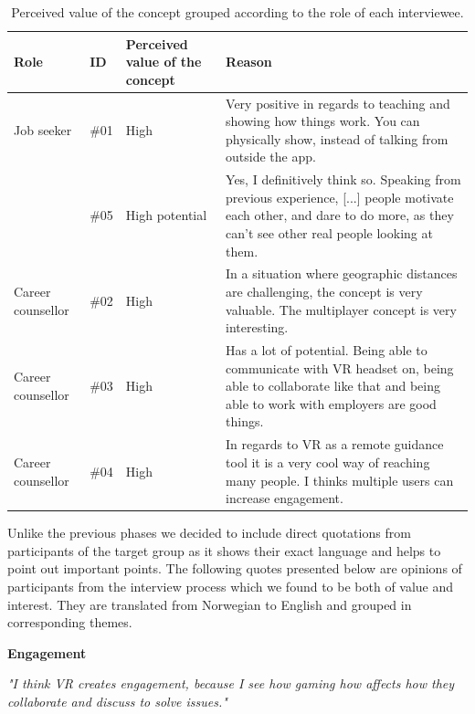 \begin{table}[H]
      \centering
        \begin{tabular}{llp{2.5cm}p{5cm}}
        \toprule
        Role & ID & Perceived value of the concept & Reason\\
        \midrule\vspace{0.2cm}
         Job seeker  & \#01 & High & Very positive in regards to teaching and showing how things work. You can physically show, instead of talking from outside the app.\\
         & \#05  & High potential & Yes, I definitively think so. Speaking from previous experience, [...] people motivate each other, and dare to do more, as they can't see other real people looking at them.
         \\\midrule \vspace{0.2cm}
        Career counsellor & \#02  & High & In a situation where geographic distances are challenging, the concept is very valuable. The multiplayer concept is very interesting.\\ \vspace{0.2cm}
        Career counsellor & \#03  & High & Has a lot of potential. Being able to communicate with VR headset on, being able to collaborate like that and being able to work with employers are good things. \\ 
        Career counsellor & \#04  & High & In regards to VR as a remote guidance tool it is a very cool way of reaching many people. I thinks multiple users can increase engagement. \\
        \bottomrule
        \end{tabular}
        \caption{Perceived value of the concept grouped according to the role of each interviewee.}
        \label{table:phase3SatisfactionAnalysis}
\end{table}

Unlike the previous phases we decided to include direct quotations from participants of the target group as it shows their exact language and helps to point out important points. 
The following quotes presented below are opinions of participants from the interview process which we found to be both of value and interest. They are translated from Norwegian to English and grouped in corresponding themes.

\vspace{0.2cm}
\noindent\textbf{Engagement}
\label{quote:engagement}
\begin{displayquote}
\textit{"I think VR creates engagement, because I see how gaming how affects how they collaborate and discuss to solve issues."}
\end{displayquote}

